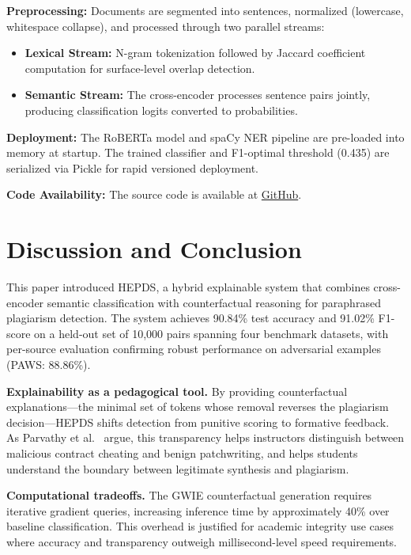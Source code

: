 \documentclass[pdflatex,sn-basic]{sn-jnl}
\begin{document}
\textbf{Preprocessing:} Documents are segmented into sentences, normalized (lowercase, whitespace collapse), and processed through two parallel streams:
\begin{itemize}
    \item \textbf{Lexical Stream:} N-gram tokenization followed by Jaccard coefficient computation for surface-level overlap detection.
    \item \textbf{Semantic Stream:} The cross-encoder processes sentence pairs jointly, producing classification logits converted to probabilities.
\end{itemize}

\textbf{Deployment:} The RoBERTa model and spaCy NER pipeline are pre-loaded into memory at startup. The trained classifier and F1-optimal threshold (0.435) are serialized via Pickle for rapid versioned deployment.

\textbf{Code Availability:} The source code is available at \href{https://github.com/Darsh-14/DePlag--A-Web-Based-Explainable-NLP-System-for-Detecting-Paraphrased-Plagiarism}{GitHub}.

\section{Discussion and Conclusion}

This paper introduced HEPDS, a hybrid explainable system that combines cross-encoder semantic classification with counterfactual reasoning for paraphrased plagiarism detection. The system achieves 90.84\% test accuracy and 91.02\% F1-score on a held-out set of 10,000 pairs spanning four benchmark datasets, with per-source evaluation confirming robust performance on adversarial examples (PAWS: 88.86\%).

\textbf{Explainability as a pedagogical tool.} By providing counterfactual explanations---the minimal set of tokens whose removal reverses the plagiarism decision---HEPDS shifts detection from punitive scoring to formative feedback. As Parvathy et al.~\cite{parvathy2025automated} argue, this transparency helps instructors distinguish between malicious contract cheating and benign patchwriting, and helps students understand the boundary between legitimate synthesis and plagiarism.

\textbf{Computational tradeoffs.} The GWIE counterfactual generation requires iterative gradient queries, increasing inference time by approximately 40\% over baseline classification. This overhead is justified for academic integrity use cases where accuracy and transparency outweigh millisecond-level speed requirements.
\end{document}
